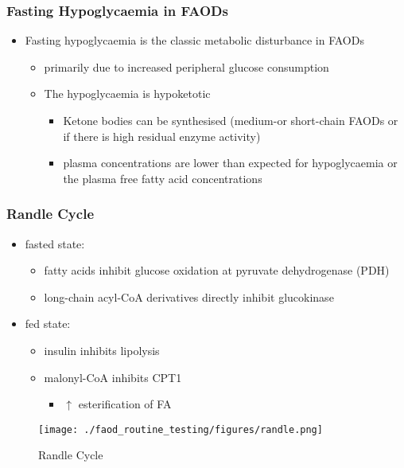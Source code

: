 \documentclass{scrartcl}
\begin{document}
\subsubsection{Fasting Hypoglycaemia  in FAODs}
\label{sec:org27bdc81}
\begin{itemize}
\item Fasting hypoglycaemia is the classic metabolic disturbance in FAODs
\begin{itemize}
\item primarily due to increased peripheral glucose consumption
\end{itemize}
\begin{itemize}
\item The hypoglycaemia is hypoketotic
\begin{itemize}
\item Ketone bodies can be synthesised (medium-or short-chain FAODs or
if there is high residual enzyme activity)
\item plasma concentrations are lower than expected for hypoglycaemia or
the plasma free fatty acid concentrations
\end{itemize}
\end{itemize}
\end{itemize}

\subsubsection{Randle Cycle}
\label{sec:org11c3ba1}
\begin{itemize}
\item fasted state:
\begin{itemize}
\item fatty acids inhibit glucose oxidation at pyruvate dehydrogenase
(PDH)
\item long-chain acyl-CoA derivatives directly inhibit glucokinase
\end{itemize}
\item fed state:
\begin{itemize}
\item insulin inhibits lipolysis
\item malonyl-CoA inhibits CPT1
\begin{itemize}
\item \(\uparrow\) esterification of FA
\end{itemize}
\end{itemize}
\end{itemize}

\begin{figure}[htbp]
\centering
\texttt{[image: ./faod\_routine\_testing/figures/randle.png]}
\caption{\label{fig:org7c00d80}
Randle Cycle}
\end{figure}
\end{document}
